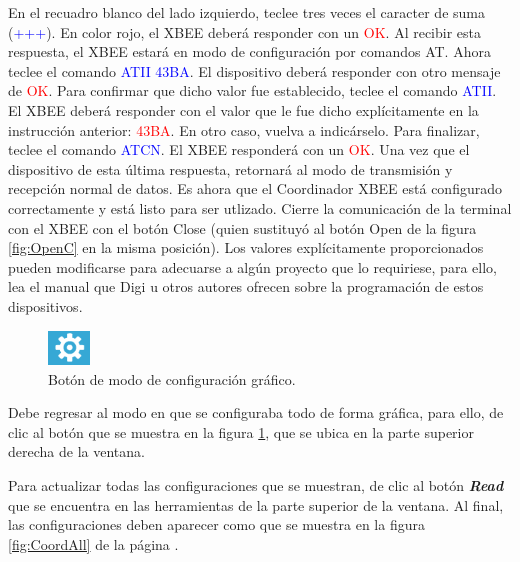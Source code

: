 En el recuadro blanco del lado izquierdo, teclee tres veces el caracter de suma (\textcolor{blue}{+++}). En color rojo, el XBEE deberá responder con un \textcolor{red}{OK}. Al recibir esta respuesta, el XBEE estará en modo de configuración por comandos AT\footnotemark. Ahora teclee el comando \textcolor{blue}{ATII 43BA}. El dispositivo deberá responder con otro mensaje de \textcolor{red}{OK}. Para confirmar que dicho valor fue establecido, teclee el comando \textcolor{blue}{ATII}. El XBEE deberá responder con el valor que le fue dicho explícitamente en la instrucción anterior: \textcolor{red}{43BA}. En otro caso, vuelva a indicárselo. Para finalizar, teclee el comando \textcolor{blue}{ATCN}. El XBEE responderá con un \textcolor{red}{OK}. Una vez que el dispositivo de esta última respuesta, retornará al modo de transmisión y recepción normal de datos. Es ahora que el Coordinador XBEE está configurado correctamente y está listo para ser utlizado. Cierre la comunicación de la terminal con el XBEE con el botón Close (quien sustituyó al botón Open de la figura \ref{fig:OpenC} en la misma posición). Los valores explícitamente proporcionados pueden modificarse para adecuarse a algún proyecto que lo requiriese, para ello, lea el manual que Digi u otros autores ofrecen sobre la programación de estos dispositivos.

\begin{figure} %
    \centering
    \includegraphics[width=0.10\textwidth]{Figures/XCTU/ConfMode}
    \caption[1]{Botón de modo de configuración gráfico.}
    \label{fig:ConMode}
\end{figure}

Debe regresar al modo en que se configuraba todo de forma gráfica, para ello, de clic al botón que se muestra en la figura \ref{fig:ConMode}, que se ubica en la parte superior derecha de la ventana.

Para actualizar todas las configuraciones que se muestran, de clic al botón \textit{\textbf{Read}} que se encuentra en las herramientas de la parte superior de la ventana. Al final, las configuraciones deben aparecer como que se muestra en la figura \ref{fig:CoordAll} de la página \pageref{fig:CoordAll}.


